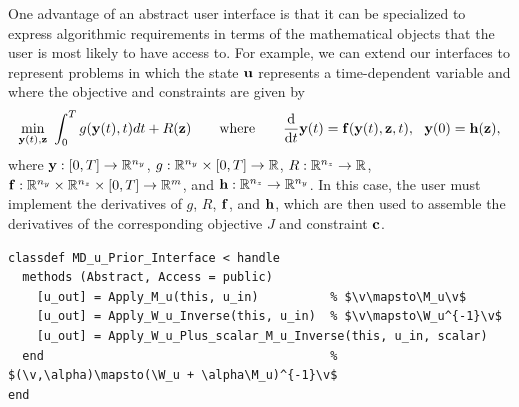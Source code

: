 \begin{remark}
One advantage of an abstract user interface is that it can be specialized to express algorithmic requirements in terms of the mathematical objects that the user is most likely to have access to.
For example, we can extend our interfaces to represent problems in which the state $\mathbf{u}$ represents a time-dependent variable and where the objective and constraints are given by
\begin{gather*}
    \min_{\mathbf{y}(t),\mathbf{z}}~\int_{0}^{T} g(\mathbf{y}(t),t) dt + R(\mathbf{z})
    \qquad
    \textup{where}
    \qquad
    \frac{\textrm{d}}{\textup{d}t}\mathbf{y}(t) = \mathbf{f}(\mathbf{y}(t), \mathbf{z}, t), ~~ \mathbf{y}(0) = \mathbf{h}(\mathbf{z}),
\end{gather*}
where
$\mathbf{y} : [0,T] \to \mathbb{R}^{n_y}$,
$g : \mathbb{R}^{n_y} \times [0, T] \to \mathbb{R}$,
$R : \mathbb{R}^{n_z} \to \mathbb{R}$,
$\mathbf{f} : \mathbb{R}^{n_y} \times \mathbb{R}^{n_z} \times [0,T]  \to \mathbb{R}^m$,
and
$\mathbf{h} : \mathbb{R}^{n_z} \to \mathbb{R}^{n_y}$.
In this case, the user must implement the derivatives of $g$, $R$, $\mathbf{f}$, and $\mathbf{h}$, which are then used to assemble the derivatives of the corresponding objective $J$ and constraint $\mathbf{c}$.
\end{remark}


\begin{listing}[t]
\begin{verbatim}
classdef MD_u_Prior_Interface < handle
  methods (Abstract, Access = public)
    [u_out] = Apply_M_u(this, u_in)          % $\v\mapsto\M_u\v$
    [u_out] = Apply_W_u_Inverse(this, u_in)  % $\v\mapsto\W_u^{-1}\v$
    [u_out] = Apply_W_u_Plus_scalar_M_u_Inverse(this, u_in, scalar)
  end                                        % $(\v,\alpha)\mapsto(\W_u + \alpha\M_u)^{-1}\v$
end
\end{verbatim}
\caption{Outline of the \MATLAB class for the state prior distribution in \SABL.}
\label{code:sabl-hdsa}
\end{listing}

